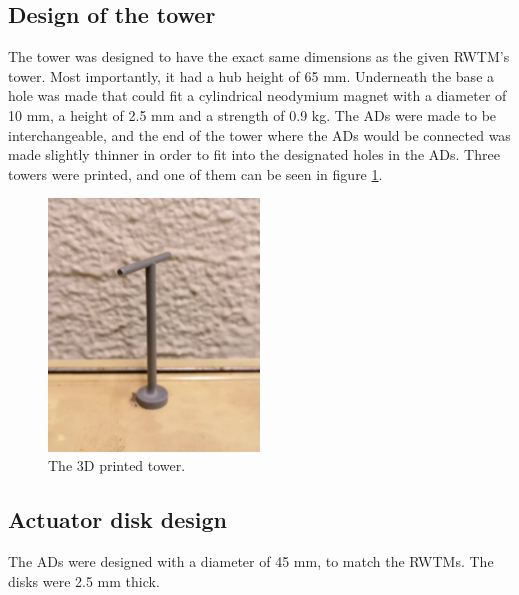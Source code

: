\subsection{Design of the tower}
The tower was designed to have the exact same dimensions as the given \gls{RWTM}'s tower. Most importantly, it had a hub height of 65 \si{\mm}. Underneath the base a hole was made that could fit a cylindrical neodymium magnet with a diameter of 10 \si{\mm}, a height of 2.5 \si{\mm} and a strength of 0.9 \si{\kg}. The \gls{AD}s were made to be interchangeable, and the end of the tower where the \gls{AD}s would be connected was made slightly thinner in order to fit into the designated holes in the \gls{AD}s. Three towers were printed, and one of them can be seen in figure \ref{fig:towers}.

\begin{figure}
    \centering
    \includegraphics[width=0.5\textwidth]{0_Images/tower.jpg}    
    \caption{The 3D printed tower.}
    \label{fig:towers}
\end{figure}


\subsection{Actuator disk design}
The \gls{AD}s were designed with a diameter of 45 \si{\mm}, to match the \gls{RWTM}s. The disks were 2.5 \si{\mm} thick.

